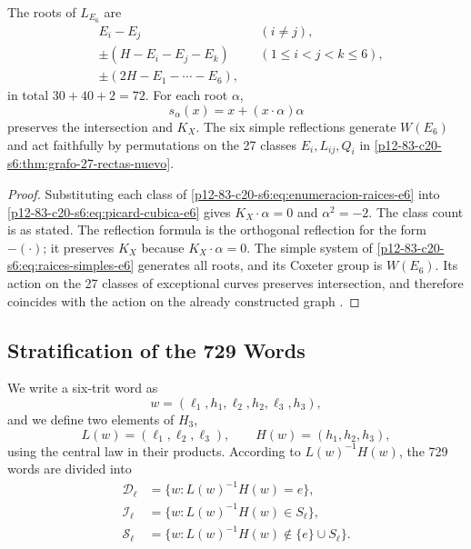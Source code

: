 \begin{proposition}
\label{p12-83-c20-s6:prop:setenta-dos-raices-e6}
The roots of \(L_{E_6}\) are
\begin{equation}
 \begin{aligned}
 &E_i-E_j &&(i\ne j),\\
 &\pm(H-E_i-E_j-E_k) &&(1\le i<j<k\le6),\\
 &\pm(2H-E_1-\cdots-E_6),
 \end{aligned}
 \label{p12-83-c20-s6:eq:enumeracion-raices-e6}
\end{equation}
in total \(30+40+2=72\). For each root \(\alpha\),
\begin{equation}
 s_\alpha(x)=x+(x\cdot\alpha)\alpha
 \label{p12-83-c20-s6:eq:reflexion-raiz-e6}
\end{equation}
preserves the intersection and \(K_X\). The six simple reflections generate
\(W(E_6)\) and act faithfully by permutations on the 27 classes
\(E_i,L_{ij},Q_i\) in \cref{p12-83-c20-s6:thm:grafo-27-rectas-nuevo}.
\end{proposition}

\begin{proof}
Substituting each class of \cref{p12-83-c20-s6:eq:enumeracion-raices-e6} into
\cref{p12-83-c20-s6:eq:picard-cubica-e6} gives \(K_X\cdot\alpha=0\) and
\(\alpha^2=-2\). The class count is as stated. The reflection formula
is the orthogonal reflection for the form \(-(\cdot)\); it preserves \(K_X\) because
\(K_X\cdot\alpha=0\). The simple system of
\cref{p12-83-c20-s6:eq:raices-simples-e6} generates all roots, and its Coxeter group is
\(W(E_6)\). Its action on the 27 classes of exceptional curves preserves
intersection, and therefore coincides with the action on the already
constructed graph \cite{Manivel2005}.
\end{proof}

\subsection{Stratification of the 729 Words}

We write a six-trit word as
\[
 w=(\ell_1,h_1,\ell_2,h_2,\ell_3,h_3),
\]
and we define two elements of \(H_3\),
\[
 L(w)=(\ell_1,\ell_2,\ell_3),\qquad
 H(w)=(h_1,h_2,h_3),
\]
using the central law in their products. According to
\(L(w)^{-1}H(w)\), the 729 words are divided into
\begin{align*}
 \mathcal D_\ell&=\{w:L(w)^{-1}H(w)=e\},\\
 \mathcal I_\ell&=\{w:L(w)^{-1}H(w)\in S_\ell\},\\
 \mathcal S_\ell&=\{w:L(w)^{-1}H(w)\notin\{e\}\cup S_\ell\}.
\end{align*}

